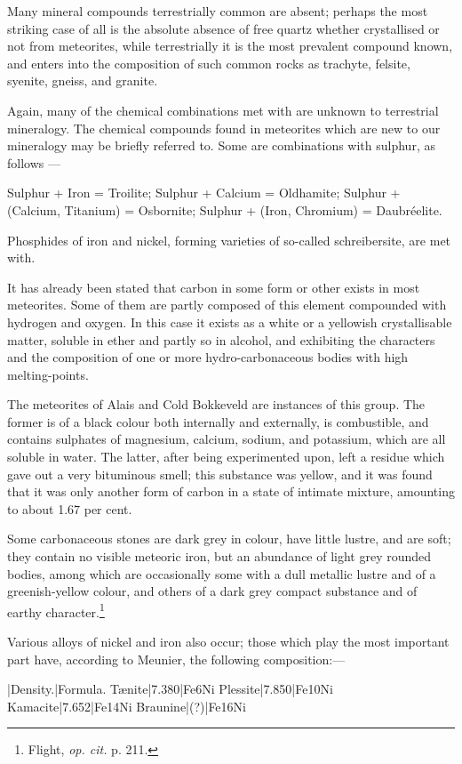 \documentclass[a4paper, 12pt, oneside, polutonikogreek, english]{article}
\begin{document}
Many mineral compounds terrestrially common are absent; perhaps the most striking case of all is the absolute absence of free quartz whether crystallised or not from meteorites, while terrestrially it is the most prevalent compound known, and enters into the composition of such common rocks as trachyte, felsite, syenite, gneiss, and granite.

Again, many of the chemical combinations met with are unknown to terrestrial mineralogy. The chemical compounds found in meteorites which are new to our mineralogy may be briefly referred to. Some are combinations with sulphur, as follows ---

Sulphur + Iron = Troilite; 
Sulphur + Calcium = Oldhamite; 
Sulphur + (Calcium, Titanium) = Osbornite; 
Sulphur + (Iron, Chromium) = Daubréelite. 

Phosphides of iron and nickel, forming varieties of so-called schreibersite, are met with.

It has already been stated that carbon in some form or other exists in most meteorites. Some of them are partly composed of this element compounded with hydrogen and oxygen. In this case it exists as a white or a yellowish crystallisable matter, soluble in ether and partly so in alcohol, and exhibiting the characters and the composition of one or more hydro-carbonaceous bodies with high melting-points.

The meteorites of Alais and Cold Bokkeveld are instances of this group. The former is of a black colour both internally and externally, is combustible, and contains sulphates of magnesium, calcium, sodium, and potassium, which are all soluble in water. The latter, after being experimented upon, left a residue which gave out a very bituminous smell; this substance was yellow, and it was found that it was only another form of carbon in a state of intimate mixture, amounting to about 1.67 per cent.

Some carbonaceous stones are dark grey in colour, have little lustre, and are soft; they contain no visible meteoric iron, but an abundance of light grey rounded bodies, among which are occasionally some with a dull metallic lustre and of a greenish-yellow colour, and others of a dark grey compact substance and of earthy character.\footnote{Flight, \emph{op. cit.} p. 211.}

Various alloys of nickel and iron also occur; those which play the most important part have, according to Meunier, the following composition:---

|Density.|Formula. 
Tænite|7.380|Fe6Ni 
Plessite|7.850|Fe10Ni 
Kamacite|7.652|Fe14Ni 
Braunine|(?)|Fe16Ni 
\end{document}
